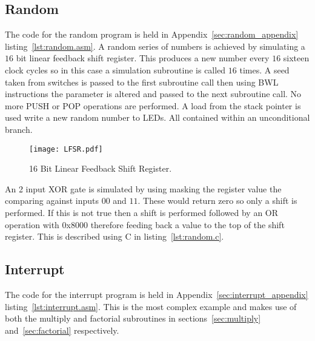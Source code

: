 






\subsection{Random}
The code for the random program is held in Appendix~\ref{sec:random_appendix} listing~\ref{lst:random.asm}.
A random series of numbers is achieved by simulating a $16$ bit linear feedback shift register. 
This produces a new number every $16$ sixteen clock cycles so in this case a simulation subroutine is called $16$ times.
A seed taken from switches is passed to the first subroutine call then using BWL instructions the parameter is altered and passed to the next subroutine call.
No more PUSH or POP operations are performed.
A load from the stack pointer is used write a new random number to LEDs.
All contained within an unconditional branch.

\begin{figure}[ht]
   \centering
    \texttt{[image: LFSR.pdf]}
   \caption{16 Bit Linear Feedback Shift Register.}
   \label{fig:circles}
\end{figure}

An 2 input XOR gate is simulated by using masking the register value the comparing against inputs $00$ and $11$.
These would return zero so only a shift is performed.
If this is not true then a shift is performed followed by an OR operation with $0$x$8000$ therefore feeding back a value to the top of the shift register.
This is described using C in listing~\ref{lst:random.c}. 







\subsection{Interrupt}
The code for the interrupt program is held in Appendix~\ref{sec:interrupt_appendix} listing~\ref{lst:interrupt.asm}.
This is the most complex example and makes use of both the multiply and factorial subroutines in sections~\ref{sec:multiply} and~\ref{sec:factorial} respectively.







